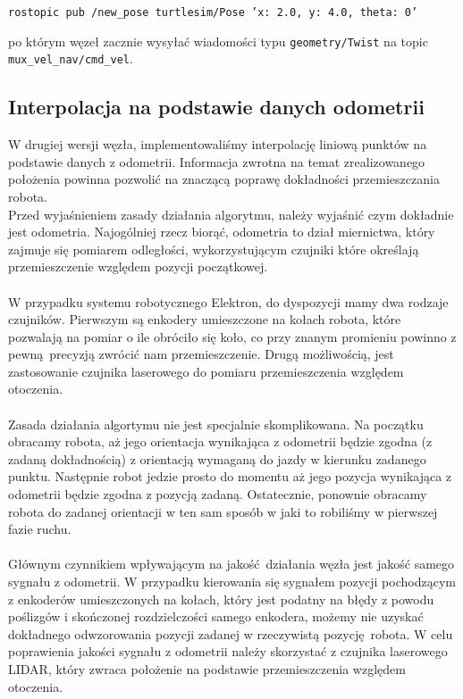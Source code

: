 \documentclass{mwrep}
\begin{document}
\begin{center}
    \texttt{rostopic pub /new\_{}pose turtlesim/Pose '{x: 2.0, y: 4.0, theta: 0}'}
\end{center}

po którym węzeł zacznie wysyłać wiadomości typu \texttt{geometry/Twist} na topic 
\texttt{mux\_{}vel\_{}nav/cmd\_{}vel}.

\newpage

\subsection{Interpolacja na podstawie danych odometrii}
W drugiej wersji węzła, implementowaliśmy interpolację liniową punktów na podstawie 
danych z odometrii. Informacja zwrotna na temat zrealizowanego położenia powinna 
pozwolić na znaczącą poprawę dokładności przemieszczania robota.\\

\indent{} Przed wyjaśnieniem zasady działania algorytmu, należy wyjaśnić czym dokładnie
jest odometria. Najogólniej rzecz biorąć, odometria to dział miernictwa, który zajmuje się 
pomiarem odległości, wykorzystującym czujniki które określają przemieszczenie względem pozycji 
początkowej. \\
\\
\indent{} W przypadku systemu robotycznego Elektron, do dyspozycji mamy dwa rodzaje czujników.
Pierwszym są enkodery umieszczone na kołach robota, które pozwalają na pomiar o ile obróciło się koło,
co przy znanym promieniu powinno z pewną precyzją zwrócić nam przemieszczenie. Drugą możliwością, jest 
zastosowanie czujnika laserowego do pomiaru przemieszczenia względem otoczenia.\\
\\
\indent{} Zasada działania algortymu nie jest specjalnie skomplikowana. Na początku obracamy robota,
aż jego orientacja wynikająca z odometrii będzie zgodna (z zadaną dokładnością) z orientacją wymaganą do jazdy
w kierunku zadanego punktu. Następnie robot jedzie prosto do momentu aż jego pozycja wynikająca
z odometrii będzie zgodna z pozycją zadaną. Ostatecznie, ponownie obracamy robota do zadanej 
orientacji w ten sam sposób w jaki to robiliśmy w pierwszej fazie ruchu.\\
\\
\indent{} Głównym czynnikiem wpływającym na jakość działania węzła jest jakość samego sygnału
z odometrii. W przypadku kierowania się sygnałem pozycji pochodzącym z enkoderów umieszczonych 
na kołach, który jest podatny na błędy z powodu poślizgów i skończonej rozdzielczości samego enkodera,
możemy nie uzyskać dokładnego odwzorowania pozycji zadanej w rzeczywistą pozycję robota. 
W celu poprawienia jakości sygnału z odometrii należy skorzystać z czujnika laserowego LIDAR, który 
zwraca położenie na podstawie przemieszczenia względem otoczenia. 
\end{document}
